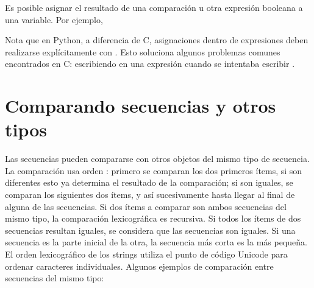 \documentclass[a5paper,10pt,spanish]{sphinxmanual}
\begin{document}
\sphinxAtStartPar
Es posible asignar el resultado de una comparación u otra expresión booleana a una variable.  Por ejemplo,

\begin{sphinxVerbatim}[commandchars=\\\{\}]
      
      
\end{sphinxVerbatim}

\sphinxAtStartPar
Nota que en Python, a diferencia de C, asignaciones dentro de expresiones deben realizarse explícitamente con  \sphinxcode{\sphinxupquote{:=}}. Esto soluciona algunos problemas comunes encontrados en C: escribiendo \sphinxcode{\sphinxupquote{=}} en una expresión cuando se intentaba escribir \sphinxcode{\sphinxupquote{==}}.


\section{Comparando secuencias y otros tipos}
\label{\detokenize{tutorial/datastructures:comparing-sequences-and-other-types}}\label{\detokenize{tutorial/datastructures:tut-comparing}}
\sphinxAtStartPar
Las secuencias pueden compararse con otros objetos del mismo tipo de secuencia. La comparación usa orden : primero se comparan los dos primeros ítems, si son diferentes esto ya determina el resultado de la comparación; si son iguales, se comparan los siguientes dos ítems, y así sucesivamente hasta llegar al final de alguna de las secuencias. Si dos ítems a comparar son ambos secuencias del mismo tipo, la comparación lexicográfica es recursiva.  Si todos los ítems de dos secuencias resultan iguales, se considera que las secuencias son iguales. Si una secuencia es la parte inicial de la otra, la secuencia más corta es la más pequeña. El orden lexicográfico de los strings utiliza el punto de código Unicode para ordenar caracteres individuales. Algunos ejemplos de comparación entre secuencias del mismo tipo:
\end{document}
